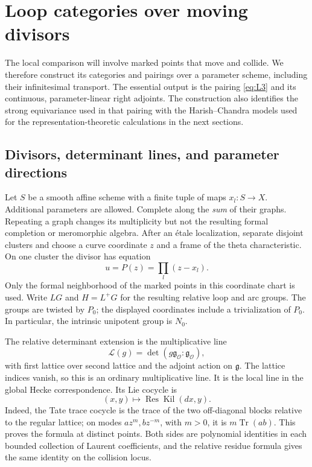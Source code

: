 \section{Loop categories over moving divisors}\label{sec:loop}

The local comparison will involve marked points that move and collide.  We
therefore construct its categories and pairings over a parameter scheme,
including their infinitesimal transport.  The essential output is the
pairing \eqref{eq:L3} and its continuous, parameter-linear right adjoints.
The construction also identifies the strong equivariance used in that
pairing with the Harish--Chandra models used for the representation-theoretic
calculations in the next sections.

\subsection{Divisors, determinant lines, and parameter directions}

Let $S$ be a smooth affine scheme with a finite tuple of maps $x_l:S\to X$.
Additional parameters are allowed.  Complete along the \emph{sum} of their
graphs.  Repeating a graph changes its multiplicity but not the resulting
formal completion or meromorphic algebra.  After an \'etale localization,
separate disjoint clusters and choose a curve coordinate $z$ and a frame
of the theta characteristic.  On one cluster the divisor has equation
\[
                 u=P(z)=\prod_l(z-x_l).
\]
Only the formal neighborhood of the marked points in this coordinate
chart is used.  Write $LG$ and $H=L^+G$ for the resulting relative loop and
arc groups.  The groups are twisted by $P_0$; the displayed coordinates
include a trivialization of $P_0$.  In particular, the intrinsic unipotent
group is $N_0$.

The relative determinant extension is the multiplicative line
\[
     \mathcal L(g)=\det(g\mathfrak g_{\mathcal O}:\mathfrak g_{\mathcal O}),
\]
with first lattice over second lattice and the adjoint action on
$\mathfrak g$.  The lattice indices vanish, so this is an ordinary
multiplicative line.  It is the local line in the global Hecke
correspondence.  Its Lie cocycle is
\[
                       (x,y)\longmapsto
                       \operatorname{Res}\operatorname{Kil}(dx,y).
\]
Indeed, the Tate trace cocycle is the trace of the two off-diagonal
blocks relative to the regular lattice; on modes $az^m,bz^{-m}$, with
$m>0$, it is $m\operatorname{Tr}(ab)$.  This proves the formula at distinct
points.  Both sides are polynomial identities in each bounded collection
of Laurent coefficients, and the relative residue formula gives the same
identity on the collision locus.

